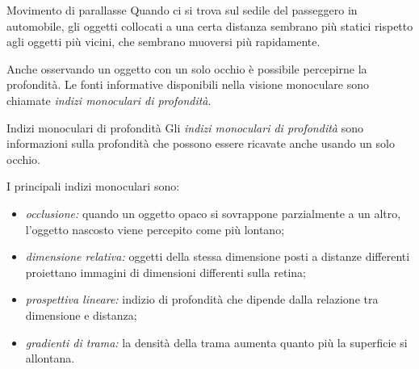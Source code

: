 \documentclass[a4paper]{article}
\begin{document}
\begin{snippetexample}{Movimento di parallasse}
    Quando ci si trova sul sedile del passeggero in automobile, gli oggetti collocati a una certa distanza sembrano più statici rispetto agli oggetti più vicini, che sembrano muoversi più rapidamente.
\end{snippetexample}
Anche osservando un oggetto con un solo occhio è possibile percepirne la profondità. Le fonti informative disponibili nella visione monoculare sono chiamate \emph{indizi monoculari di profondità}.
\begin{snippetdefinition}{Indizi monoculari di profondità}
    Gli \emph{indizi monoculari di profondità} sono informazioni sulla profondità che possono essere ricavate anche usando un solo occhio.
\end{snippetdefinition}
I principali indizi monoculari sono:
\begin{itemize}
    \item \emph{occlusione:} quando un oggetto opaco si sovrappone parzialmente a un altro, l'oggetto nascosto viene percepito come più lontano;
    \item \emph{dimensione relativa:} oggetti della stessa dimensione posti a distanze differenti proiettano immagini di dimensioni differenti sulla retina;
    \item \emph{prospettiva lineare:} indizio di profondità che dipende dalla relazione tra dimensione e distanza;
    \item \emph{gradienti di trama:} la densità della trama aumenta quanto più la superficie si allontana.
\end{itemize}
\end{document}
